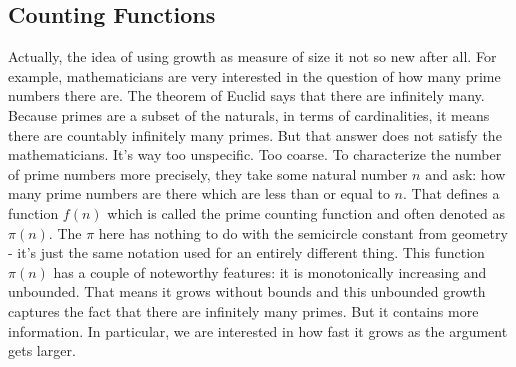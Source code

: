 \documentclass[12pt]{article}
\begin{document}


\subsection{Counting Functions}
Actually, the idea of using growth as measure of size it not so new after all. For example, mathematicians are very interested in the question of how many prime numbers there are. The theorem of Euclid says that there are infinitely many. Because primes are a subset of the naturals, in terms of cardinalities, it means there are countably infinitely many primes. But that answer does not satisfy the mathematicians. It's way too unspecific. Too coarse. To characterize the number of prime numbers more precisely, they take some natural number $n$ and ask: how many prime numbers are there which are less than or equal to $n$. That defines a function $f(n)$ which is called the prime counting function and often denoted as $\pi(n)$. The $\pi$ here has nothing to do with the semicircle constant from geometry - it's just the same notation used for an entirely different thing. This function $\pi(n)$ has a couple of noteworthy features: it is monotonically increasing and unbounded. That means it grows without bounds and this unbounded growth captures the fact that there are infinitely many primes. But it contains more information. In particular, we are interested in how fast it grows as the argument gets larger. 
\end{document}
